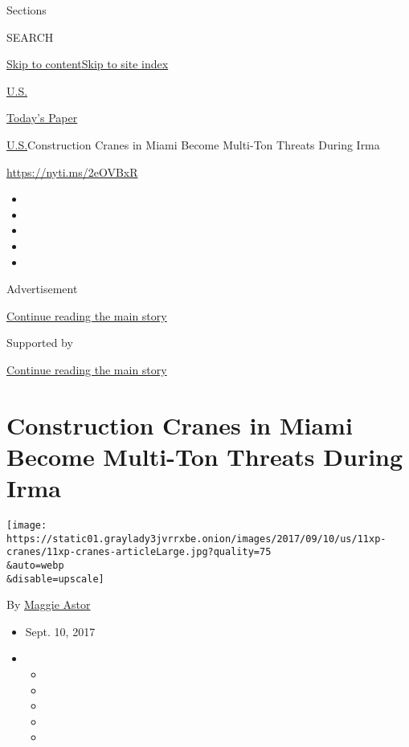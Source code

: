 Sections

SEARCH

\protect\hyperlink{site-content}{Skip to
content}\protect\hyperlink{site-index}{Skip to site index}

\href{https://www.nytimes3xbfgragh.onion/section/us}{U.S.}

\href{https://myaccount.nytimes3xbfgragh.onion/auth/login?response_type=cookie\&client_id=vi}{}

\href{https://www.nytimes3xbfgragh.onion/section/todayspaper}{Today's
Paper}

\href{/section/us}{U.S.}\textbar{}Construction Cranes in Miami Become
Multi-Ton Threats During Irma

\url{https://nyti.ms/2eOVBxR}

\begin{itemize}
\item
\item
\item
\item
\item
\end{itemize}

Advertisement

\protect\hyperlink{after-top}{Continue reading the main story}

Supported by

\protect\hyperlink{after-sponsor}{Continue reading the main story}

\hypertarget{construction-cranes-in-miami-become-multi-ton-threats-during-irma}{%
\section{Construction Cranes in Miami Become Multi-Ton Threats During
Irma}\label{construction-cranes-in-miami-become-multi-ton-threats-during-irma}}

\texttt{[image: https://static01.graylady3jvrrxbe.onion/images/2017/09/10/us/11xp-cranes/11xp-cranes-articleLarge.jpg?quality=75\\\&auto=webp\\\&disable=upscale]}

By \href{https://www.nytimes3xbfgragh.onion/by/maggie-astor}{Maggie
Astor}

\begin{itemize}
\item
  Sept. 10, 2017
\item
  \begin{itemize}
  \item
  \item
  \item
  \item
  \item
  \end{itemize}
\end{itemize}

